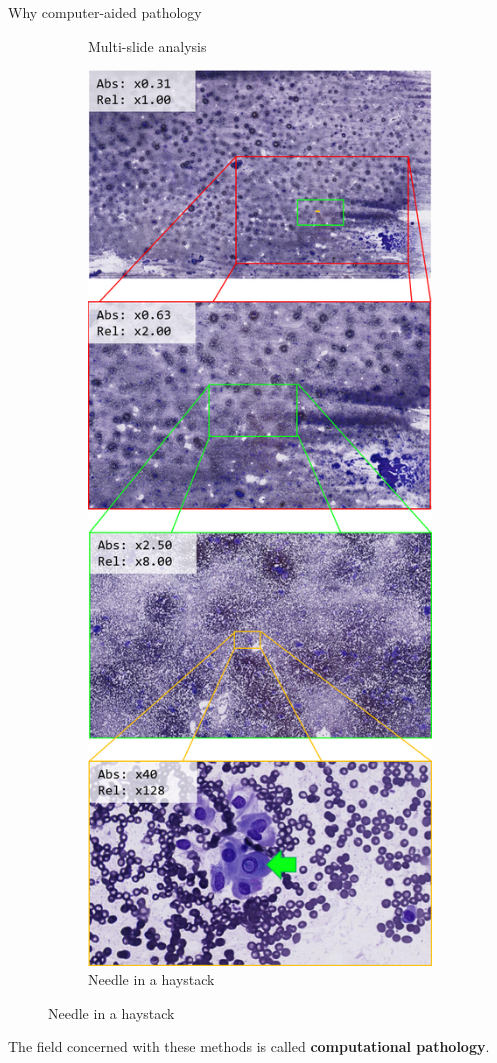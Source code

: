 \documentclass{beamer}
\begin{document}
\begin{frame}{Why computer-aided pathology}
\begin{figure}
\begin{subfigure}{0.25\textwidth}
		\vfill
		\caption{Multi-slide analysis}
	\end{subfigure}
	\begin{subfigure}{0.25\textwidth}
		\centering
		\includegraphics[height=0.2\textheight]{images/thyroid_needle_haystack.png}
		\caption{Needle in a haystack}
	\end{subfigure}
\end{figure}

\vfill
The field concerned with these methods is called \textbf{computational pathology}.

\vfill
\end{frame}
\end{document}
